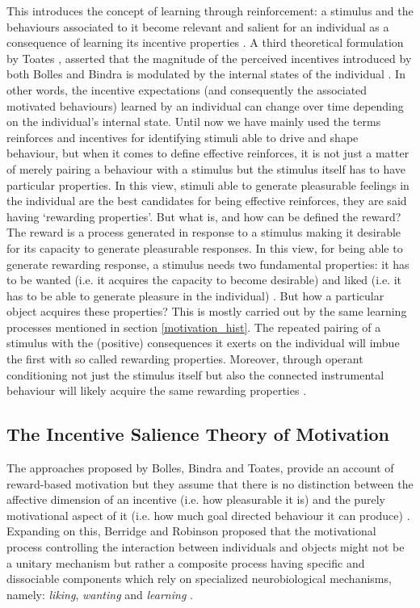 This introduces the concept of learning through reinforcement: a stimulus and the behaviours associated to it become relevant and salient for an individual as a consequence of learning its incentive properties \cite{berridge2004motivation}. A third theoretical formulation by Toates \cite{toates1994comparing}, asserted that the magnitude of the perceived incentives introduced by both Bolles and Bindra is modulated by the internal states of the individual \cite{toates1994comparing,berridge2004motivation}. In other words, the incentive expectations (and consequently the associated motivated behaviours) learned by an individual can change over time depending on the individual's internal state. Until now we have mainly used the terms reinforces and incentives for identifying stimuli able to drive and shape behaviour, but when it comes to define effective reinforces, it is not just a matter of merely pairing a behaviour with a stimulus but the stimulus itself has to have particular properties. In this view, stimuli able to generate pleasurable feelings in the individual are the best candidates for being effective reinforces, they are said having ‘rewarding properties’. But what is, and how can be defined the reward?  The reward is a process generated in response to a stimulus making it desirable for its capacity to generate pleasurable responses. In this view, for being able to generate rewarding response, a stimulus needs two fundamental properties: it has to be wanted (i.e. it acquires the capacity to become desirable) and liked (i.e. it has to be able to generate pleasure in the individual) \cite{berridge2009dissecting}. But how a particular object acquires these properties? This is mostly carried out by the same learning processes mentioned in section \ref{motivation_hist}. The repeated pairing of a stimulus with the (positive) consequences it exerts on the individual will imbue the first with so called rewarding properties. Moreover, through operant conditioning  not just the stimulus itself but also the connected instrumental behaviour will likely acquire the same rewarding properties \cite{berridge2009dissecting}. 

\subsection{The Incentive Salience Theory of Motivation}
\label{incentive_salience}
The approaches proposed by Bolles, Bindra and Toates,  provide an account of reward-based motivation but they assume that there is no distinction between the affective dimension of an incentive (i.e. how pleasurable it is) and the purely motivational aspect of it (i.e. how much goal directed behaviour it can produce) \cite{bindra1978adaptive,toates1994comparing}. Expanding on this, Berridge and Robinson proposed that the motivational process controlling the interaction between individuals and objects might not be a unitary mechanism but rather a composite process having specific and dissociable components which rely on specialized neurobiological mechanisms, namely: \emph{liking}, \emph{wanting} and \emph{learning} \cite{berridge1998role,berridge2009dissecting,smith2011disentangling}.

